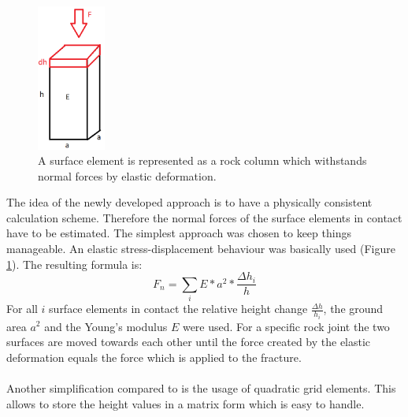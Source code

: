 \begin{figure}[htb!]
\begin{center}
\includegraphics[width=0.2\textwidth]{./figures/FFS_NormalForce.png}
\end{center}
\caption{A surface element is represented as a rock column which with\-stands normal forces by elastic deformation.}
\label{Fig:FFS-NormalForce}
\end{figure}
The idea of the newly developed approach is to have a physically consistent calculation scheme. Therefore the normal forces of the surface elements in contact have to be estimated. The simplest approach was chosen to keep things manageable. An elastic stress-displacement behaviour was basically used (Figure \ref{Fig:FFS-NormalForce}). The resulting formula is:
\begin{equation}
F_n= \sum_i E * a^2 * \frac{\Delta h_i}{h}
\end{equation}
For all $i$ surface elements in contact the relative height change $\frac{\Delta h}{h_i}$, the ground area $a^2$ and the Young's modulus $E$ were used. For a specific rock joint the two surfaces are moved towards each other until the force created by the elastic deformation equals the force which is applied to the fracture.\\
\ \\
Another simplification compared to \cite{Casagrande2017} is the usage of quadratic grid elements. This allows to store the height values in a matrix form which is easy to handle.  